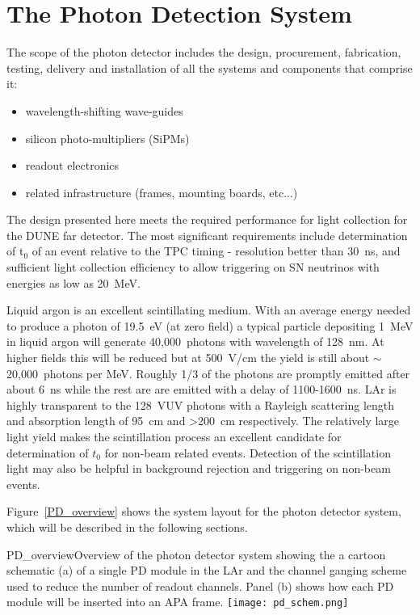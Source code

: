 \section{The Photon Detection System}
\label{sec:detectors-fd-ref-pd}

The scope of the photon detector includes the design,
procurement, fabrication, testing, delivery and installation of all
the systems and components that comprise it:  

\begin{itemize}
\item wavelength-shifting wave-guides
\item silicon photo-multipliers (SiPMs)
\item readout electronics
\item related infrastructure (frames, mounting boards, etc...)
\end{itemize}

The design presented here meets the required performance for light
collection for the DUNE far detector. The most significant
requirements include determination of t$_0$ of an event relative to
the TPC timing - resolution better than 30~ns, and sufficient light
collection efficiency to allow triggering on SN neutrinos with
energies as low as 20~MeV.

Liquid argon is an excellent scintillating medium. With an average
energy needed to produce a photon of 19.5~eV (at zero field) a typical
particle depositing 1~MeV in liquid argon will generate 40,000~photons
with wavelength of 128~nm. At higher fields this will be reduced but
at 500~V/cm the yield is still about $\sim$20,000~photons per
MeV. Roughly 1/3 of the photons are promptly emitted after about 6~ns
while the rest are are emitted with a delay of 1100-1600~ns. LAr
is highly transparent to the 128~VUV photons with a Rayleigh
scattering length and absorption length of 95~cm and >200~cm
respectively. The relatively large light yield makes the scintillation
process an excellent candidate for determination of $t_{0}$ for
non-beam related events. Detection of the scintillation light may also
be helpful in background rejection and triggering on non-beam events.  

Figure~\ref{PD_overview} shows the system layout for the photon
detector system, which will be described in the following sections. 

\begin{cdrfigure}[PD Overview]{PD_overview}{Overview of the photon detector
    system showing the a cartoon schematic (a) of a single PD module
    in the LAr and the channel ganging scheme used to reduce the
    number of readout channels. Panel (b) shows how each PD module
    will be inserted into an APA frame. }
\texttt{[image: pd\_schem.png]}
\end{cdrfigure}

